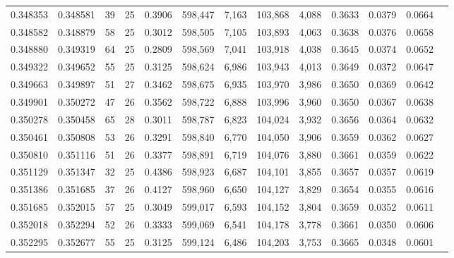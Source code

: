 \begin{tabular}{rrrrrrrrrrrrr}
0.348353 & 0.348581 &  39 &  25 &                                     0.3906 & 598,447 &   7,163 & 103,868 &   4,088 & 0.3633 & 0.0379 & 0.0664 \\
0.348582 & 0.348879 &  58 &  25 &                                     0.3012 & 598,505 &   7,105 & 103,893 &   4,063 & 0.3638 & 0.0376 & 0.0658 \\
0.348880 & 0.349319 &  64 &  25 &                                     0.2809 & 598,569 &   7,041 & 103,918 &   4,038 & 0.3645 & 0.0374 & 0.0652 \\
0.349322 & 0.349652 &  55 &  25 &                                     0.3125 & 598,624 &   6,986 & 103,943 &   4,013 & 0.3649 & 0.0372 & 0.0647 \\
0.349663 & 0.349897 &  51 &  27 &                                     0.3462 & 598,675 &   6,935 & 103,970 &   3,986 & 0.3650 & 0.0369 & 0.0642 \\
0.349901 & 0.350272 &  47 &  26 &                                     0.3562 & 598,722 &   6,888 & 103,996 &   3,960 & 0.3650 & 0.0367 & 0.0638 \\
0.350278 & 0.350458 &  65 &  28 &                                     0.3011 & 598,787 &   6,823 & 104,024 &   3,932 & 0.3656 & 0.0364 & 0.0632 \\
0.350461 & 0.350808 &  53 &  26 &                                     0.3291 & 598,840 &   6,770 & 104,050 &   3,906 & 0.3659 & 0.0362 & 0.0627 \\
0.350810 & 0.351116 &  51 &  26 &                                     0.3377 & 598,891 &   6,719 & 104,076 &   3,880 & 0.3661 & 0.0359 & 0.0622 \\
0.351129 & 0.351347 &  32 &  25 &                                     0.4386 & 598,923 &   6,687 & 104,101 &   3,855 & 0.3657 & 0.0357 & 0.0619 \\
0.351386 & 0.351685 &  37 &  26 &                                     0.4127 & 598,960 &   6,650 & 104,127 &   3,829 & 0.3654 & 0.0355 & 0.0616 \\
0.351685 & 0.352015 &  57 &  25 &                                     0.3049 & 599,017 &   6,593 & 104,152 &   3,804 & 0.3659 & 0.0352 & 0.0611 \\
0.352018 & 0.352294 &  52 &  26 &                                     0.3333 & 599,069 &   6,541 & 104,178 &   3,778 & 0.3661 & 0.0350 & 0.0606 \\
0.352295 & 0.352677 &  55 &  25 &                                     0.3125 & 599,124 &   6,486 & 104,203 &   3,753 & 0.3665 & 0.0348 & 0.0601 \\

\end{tabular}
